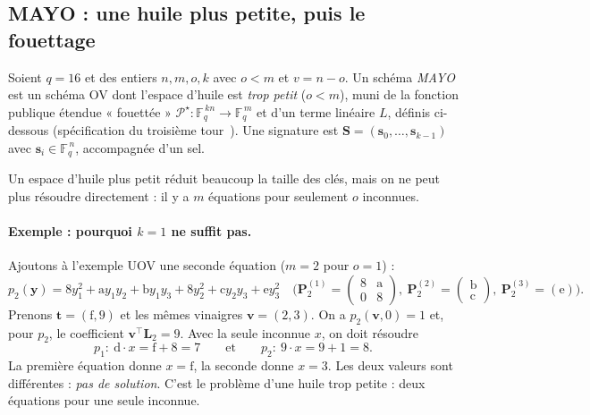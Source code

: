 \subsection{MAYO : une huile plus petite, puis le fouettage}
\begin{definition}
Soient $q=16$ et des entiers $n,m,o,k$ avec $o<m$ et $v=n-o$. Un schéma \emph{MAYO} est un schéma OV dont l'espace d'huile est \emph{trop petit} ($o<m$), muni de la fonction publique étendue « fouettée » $\mathcal{P}^\star:\mathbb{F}_q^{\,kn}\to\mathbb{F}_q^{\,m}$ et d'un terme linéaire $L$, définis ci-dessous (spécification du troisième tour~\cite{mayospec}). Une signature est $\mathbf{S}=(\mathbf{s}_0,\dots,\mathbf{s}_{k-1})$ avec $\mathbf{s}_i\in\mathbb{F}_q^{\,n}$, accompagnée d'un sel.
\end{definition}
Un espace d'huile plus petit réduit beaucoup la taille des clés, mais on ne peut plus résoudre directement : il y a $m$ équations pour seulement $o$ inconnues.

\paragraph{Exemple : pourquoi $k=1$ ne suffit pas.} Ajoutons à l'exemple UOV une seconde équation ($m=2$ pour $o=1$) :
\[p_2(\mathbf{y})=8y_1^2+\mathrm{a}y_1y_2+\mathrm{b}y_1y_3+8y_2^2+\mathrm{c}y_2y_3+\mathrm{e}y_3^2\quad\bigl(\mathbf{P}^{(1)}_2=\begin{pmatrix}8&\mathrm{a}\\0&8\end{pmatrix},\ \mathbf{P}^{(2)}_2=\begin{pmatrix}\mathrm{b}\\\mathrm{c}\end{pmatrix},\ \mathbf{P}^{(3)}_2=(\mathrm{e})\bigr).\]
Prenons $\mathbf{t}=(\mathrm{f},9)$ et les mêmes vinaigres $\mathbf{v}=(2,3)$. On a $p_2(\mathbf{v},0)=1$ et, pour $p_2$, le coefficient $\mathbf{v}^{\top}\mathbf{L}_2=9$. Avec la seule inconnue $x$, on doit résoudre
\[p_1:\ \mathrm{d}\cdot x=\mathrm{f}+8=7\qquad\text{et}\qquad p_2:\ 9\cdot x=9+1=8.\]
La première équation donne $x=\mathrm{f}$, la seconde donne $x=3$. Les deux valeurs sont différentes : \emph{pas de solution}. C'est le problème d'une huile trop petite : deux équations pour une seule inconnue.

